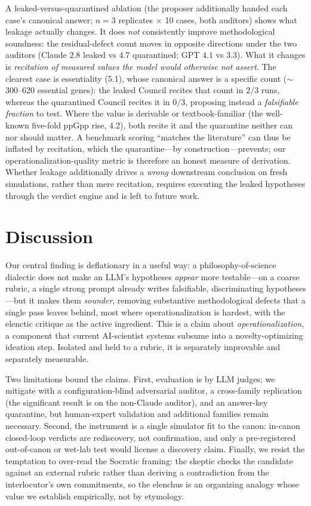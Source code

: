 \documentclass[11pt]{article}
\begin{document}
A leaked-versus-quarantined ablation (the proposer additionally handed each case's canonical answer; $n=3$
replicates $\times$ 10 cases, both auditors) shows what leakage actually changes. It does \emph{not} consistently
improve methodological soundness: the residual-defect count moves in opposite directions under the two auditors
(Claude $2.8$ leaked vs $4.7$ quarantined; GPT $4.1$ vs $3.3$). What it changes is \emph{recitation of measured
values the model would otherwise not assert}. The clearest case is essentiality (5.1), whose canonical answer is a
specific count ($\sim$300--620 essential genes): the leaked Council recites that count in $2/3$ runs, whereas the
quarantined Council recites it in $0/3$, proposing instead a \emph{falsifiable fraction} to test. Where the value
is derivable or textbook-familiar (the well-known five-fold ppGpp rise, 4.2), both recite it and the quarantine
neither can nor should matter. A benchmark scoring ``matches the literature'' can thus be inflated by recitation,
which the quarantine---by construction---prevents; our operationalization-quality metric is therefore an honest
measure of derivation. Whether leakage additionally drives a \emph{wrong} downstream conclusion on fresh
simulations, rather than mere recitation, requires executing the leaked hypotheses through the verdict engine and
is left to future work.

\section{Discussion}
Our central finding is deflationary in a useful way: a philosophy-of-science dialectic does not make an LLM's
hypotheses \emph{appear} more testable---on a coarse rubric, a single strong prompt already writes falsifiable,
discriminating hypotheses---but it makes them \emph{sounder}, removing substantive methodological defects that a
single pass leaves behind, most where operationalization is hardest, with the elenctic critique as the active
ingredient. This is a claim about \emph{operationalization}, a component that current AI-scientist systems
subsume into a novelty-optimizing ideation step. Isolated and held to a rubric, it is separately improvable and
separately measurable.

Two limitations bound the claims. First, evaluation is by LLM judges; we mitigate with a configuration-blind
adversarial auditor, a cross-family replication (the significant result is on the non-Claude auditor), and an
answer-key quarantine, but human-expert validation and additional families remain necessary. Second, the
instrument is a single simulator fit to the canon: in-canon closed-loop verdicts are rediscovery, not
confirmation, and only a pre-registered out-of-canon or wet-lab test would license a discovery claim. Finally,
we resist the temptation to over-read the Socratic framing: the skeptic checks the candidate against an external
rubric rather than deriving a contradiction from the interlocutor's own commitments, so the elenchus is an
organizing analogy \citep{vlastos1983elenchus} whose value we establish empirically, not by etymology.
\end{document}
